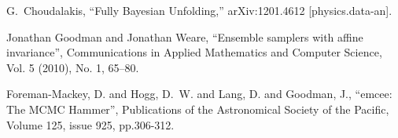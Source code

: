 \documentclass[12pt]{article}
\begin{document}

\begin{thebibliography}{99}
  G.~Choudalakis,
  ``Fully Bayesian Unfolding,''
  arXiv:1201.4612 [physics.data-an].

  Jonathan Goodman and Jonathan Weare,
  ``Ensemble samplers with affine invariance'',
  Communications in Applied Mathematics and Computer Science,
  Vol. 5 (2010), No. 1, 65–80.

Foreman-Mackey, D. and Hogg, D.~W. and {Lang}, D. and {Goodman}, J.,
``emcee: The MCMC Hammer'',
Publications of the Astronomical Society of the Pacific, Volume 125, issue 925, pp.306-312.


\end{thebibliography}
\end{document}
